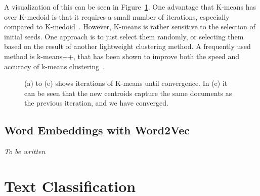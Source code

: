 A visualization of this can be seen in Figure~\ref{fig:kmeans-iterations}.
One advantage that K-means has over K-medoid is that it requires a small number of iterations, especially compared to K-medoid~\cite{aggarwal2012survey, schutze1997projections}.
However, K-means is rather sensitive to the selection of initial seeds.
One approach is to just select them randomly, or selecting them based on the result of another lightweight clustering method.
A frequently used method is k-means++, that has been shown to improve both the speed and accuracy of k-means clustering~\cite{arthur2007k}.

\begin{figure}[h!]
    \centering
    \newline
    \caption{(a) to (e) shows iterations of K-means until convergence.
        In (e) it can be seen that the new centroids capture the same documents as the previous iteration, and we have converged.}
    \label{fig:kmeans-iterations}
\end{figure}

\subsection{Word Embeddings with Word2Vec}

\textit{To be written}

\section{Text Classification}


